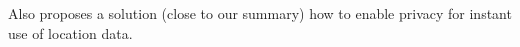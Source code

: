 		Also \parencite{casper} proposes a solution (close to our summary) how to enable privacy for instant use of location data.



